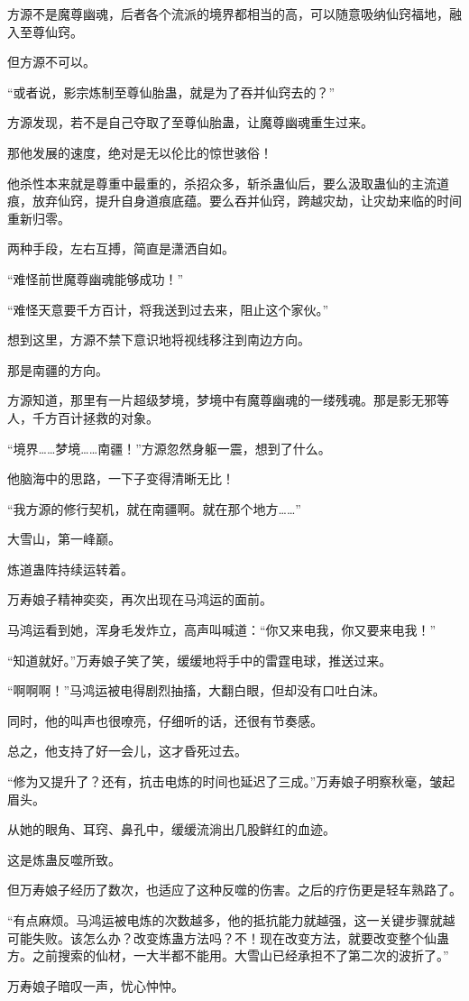 \begin{this_body}
方源不是魔尊幽魂，后者各个流派的境界都相当的高，可以随意吸纳仙窍福地，融入至尊仙窍。

但方源不可以。

“或者说，影宗炼制至尊仙胎蛊，就是为了吞并仙窍去的？”

方源发现，若不是自己夺取了至尊仙胎蛊，让魔尊幽魂重生过来。

那他发展的速度，绝对是无以伦比的惊世骇俗！

他杀性本来就是尊重中最重的，杀招众多，斩杀蛊仙后，要么汲取蛊仙的主流道痕，放弃仙窍，提升自身道痕底蕴。要么吞并仙窍，跨越灾劫，让灾劫来临的时间重新归零。

两种手段，左右互搏，简直是潇洒自如。

“难怪前世魔尊幽魂能够成功！”

“难怪天意要千方百计，将我送到过去来，阻止这个家伙。”

想到这里，方源不禁下意识地将视线移注到南边方向。

那是南疆的方向。

方源知道，那里有一片超级梦境，梦境中有魔尊幽魂的一缕残魂。那是影无邪等人，千方百计拯救的对象。

“境界……梦境……南疆！”方源忽然身躯一震，想到了什么。

他脑海中的思路，一下子变得清晰无比！

“我方源的修行契机，就在南疆啊。就在那个地方……”

大雪山，第一峰巅。

炼道蛊阵持续运转着。

万寿娘子精神奕奕，再次出现在马鸿运的面前。

马鸿运看到她，浑身毛发炸立，高声叫喊道：“你又来电我，你又要来电我！”

“知道就好。”万寿娘子笑了笑，缓缓地将手中的雷霆电球，推送过来。

“啊啊啊！”马鸿运被电得剧烈抽搐，大翻白眼，但却没有口吐白沫。

同时，他的叫声也很嘹亮，仔细听的话，还很有节奏感。

总之，他支持了好一会儿，这才昏死过去。

“修为又提升了？还有，抗击电炼的时间也延迟了三成。”万寿娘子明察秋毫，皱起眉头。

从她的眼角、耳窍、鼻孔中，缓缓流淌出几股鲜红的血迹。

这是炼蛊反噬所致。

但万寿娘子经历了数次，也适应了这种反噬的伤害。之后的疗伤更是轻车熟路了。

“有点麻烦。马鸿运被电炼的次数越多，他的抵抗能力就越强，这一关键步骤就越可能失败。该怎么办？改变炼蛊方法吗？不！现在改变方法，就要改变整个仙蛊方。之前搜索的仙材，一大半都不能用。大雪山已经承担不了第二次的波折了。”

万寿娘子暗叹一声，忧心忡忡。

\end{this_body}

